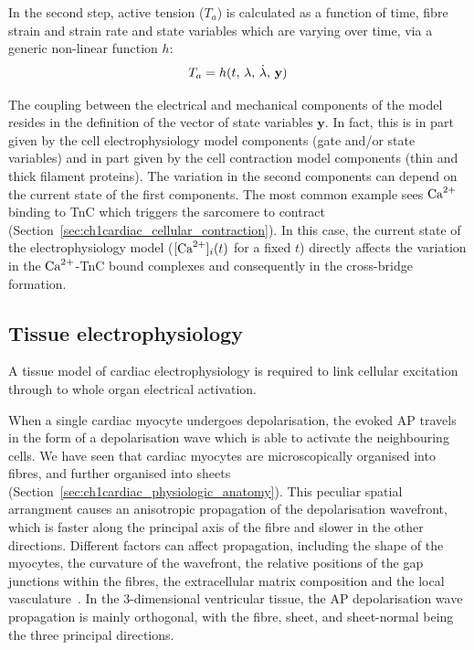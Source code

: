\vspace{0.2cm}\noindent
In the second step, active tension ($T_a$) is calculated as a function of time, fibre strain and strain rate and state variables which are varying over time, via a generic non-linear function $h$:
%
\begin{equation}\label{eq:activetensioncalc}
    T_a = h(t,\, \lambda,\,\dot{\lambda},\,\mathbf{y}) \\
\end{equation}

\vspace{0.2cm}
The coupling between the electrical and mechanical components of the model resides in the definition of the vector of state variables $\mathbf{y}$. In fact, this is in part given by the cell electrophysiology model components (gate and/or state variables) and in part given by the cell contraction model components (thin and thick filament proteins). The variation in the second components can depend on the current state of the first components. The most common example sees $\textrm{Ca}^{2+}$ binding to TnC which triggers the sarcomere to contract (Section~\ref{sec:ch1cardiac_cellular_contraction}). In this case, the current state of the electrophysiology model ($[\textrm{Ca}^{2+}]_{i}(t)$ for a fixed $t$) directly affects the variation in the $\textrm{Ca}^{2+}$-TnC bound complexes and consequently in the cross-bridge formation.


%
%
%
\subsection{Tissue electrophysiology}\label{sec:tissue_ep_math_modelling}
A tissue model of cardiac electrophysiology is required to link cellular excitation through to whole organ electrical activation.

\vspace{0.2cm}
When a single cardiac myocyte undergoes depolarisation, the evoked AP travels in the form of a depolarisation wave which is able to activate the neighbouring cells. We have seen that cardiac myocytes are microscopically organised into fibres, and further organised into sheets (Section~\ref{sec:ch1cardiac_physiologic_anatomy}). This peculiar spatial arrangment causes an anisotropic propagation of the depolarisation wavefront, which is faster along the principal axis of the fibre and slower in the other directions. Different factors can affect propagation, including the shape of the myocytes, the curvature of the wavefront, the relative positions of the gap junctions within the fibres, the extracellular matrix composition and the local vasculature~\cite{Clayton:2011}. In the $3$-dimensional ventricular tissue, the AP depolarisation wave propagation is mainly orthogonal, with the fibre, sheet, and sheet-normal being the three principal directions.

